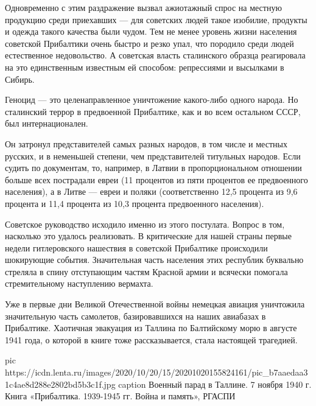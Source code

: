 Одновременно с этим раздражение вызвал ажиотажный спрос на местную продукцию
среди приехавших — для советских людей такое изобилие, продукты и одежда такого
качества были чудом. Тем не менее уровень жизни населения советской Прибалтики
очень быстро и резко упал, что породило среди людей естественное недовольство.
А советская власть сталинского образца реагировала на это единственным
известным ей способом: репрессиями и высылками в Сибирь.


Геноцид — это целенаправленное уничтожение какого-либо одного народа. Но
сталинский террор в предвоенной Прибалтике, как и во всем остальном СССР, был
интернационален.

Он затронул представителей самых разных народов, в том числе и местных русских,
и в неменьшей степени, чем представителей титульных народов. Если судить по
документам, то, например, в Латвии в пропорциональном отношении больше всех
пострадали евреи (11 процентов из пяти процентов ее предвоенного населения), а
в Литве — евреи и поляки (соответственно 12,5 процента из 9,6 процента и 11,4
процента из 10,3 процента предвоенного населения).


Советское руководство исходило именно из этого постулата. Вопрос в том,
насколько это удалось реализовать. В критические для нашей страны первые недели
гитлеровского нашествия в советской Прибалтике происходили шокирующие события.
Значительная часть населения этих республик буквально стреляла в спину
отступающим частям Красной армии и всячески помогала стремительному наступлению
вермахта.

Уже в первые дни Великой Отечественной войны немецкая авиация уничтожила
значительную часть самолетов, базировавшихся на наших авиабазах в Прибалтике.
Хаотичная эвакуация из Таллина по Балтийскому морю в августе 1941 года, о
которой в книге тоже рассказывается, стала настоящей трагедией.

\ifcmt
pic https://icdn.lenta.ru/images/2020/10/20/15/20201020155824161/pic_b7aaedaa31c4ae8d288e2802bd5b3c1f.jpg
caption Военный парад в Таллине. 7 ноября 1940 г.  Книга «Прибалтика. 1939-1945 гг. Война и память», РГАСПИ
\fi


